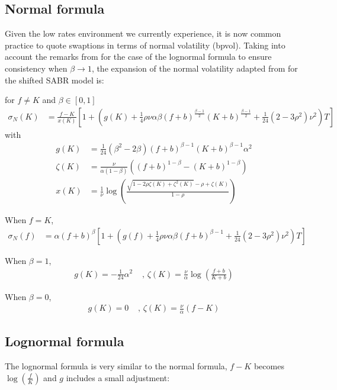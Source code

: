 \documentclass[]{rAMF2e}
\begin{document}
\subsection{Normal formula}
Given the low rates environment we currently experience, it is now common practice to quote swaptions in terms of normal volatility (bpvol). Taking into account the remarks from \citet{obloj2008fine} for the case of the lognormal formula to ensure consistency when $\beta \to 1$, the expansion of the normal volatility adapted from \citet{hagan2002managing} for the shifted SABR model is:

for $f \neq K$ and $\beta \in [0,1]$
\begin{align}
\sigma_N(K) &= \frac{f-K}{x(K)}\left[1+\left(g(K)+\frac{1}{4}\rho\nu\alpha\beta(f+b)^{\frac{\beta-1}{2}}(K+b)^{\frac{\beta-1}{2}}+\frac{1}{24}(2-3\rho^2)\nu^2\right)T\right]
\end{align}
with 
\begin{align*}
g(K) &= \frac{1}{24} (\beta^2-2\beta) (f+b)^{\beta-1} (K+b)^{\beta-1} \alpha^2\\
\zeta(K) &= \frac{\nu}{\alpha (1-\beta)} \left( (f+b)^{1-\beta} - (K+b)^{1-\beta} \right)\\
x(K) &= \frac{1}{\nu}\log\left(\frac{\sqrt{1-2\rho\zeta(K)+\zeta^2(K)}-\rho+\zeta(K)}{1-\rho} \right)
\end{align*}

When $f=K$, 
\begin{align}
\sigma_N(f) &= \alpha (f+b)^\beta \left[1+\left(g(f)+\frac{1}{4}\rho\nu\alpha\beta(f+b)^{\beta-1}+\frac{1}{24}(2-3\rho^2)\nu^2\right)T\right]
\end{align}

When $\beta = 1$,
\begin{align*}
g(K) = -\frac{1}{24}\alpha^2 &\texttt{ , } \zeta(K) = \frac{\nu}{\alpha} \log\left(\frac{f+b}{K+b}\right)
\end{align*}

When $\beta = 0$,
\begin{align*}
g(K) = 0 &\texttt{ , }\zeta(K) = \frac{\nu}{\alpha} \left(f-K\right)
\end{align*}
\subsection{Lognormal formula}
The lognormal formula is very similar to the normal formula, $f-K$ becomes $\log(\frac{f}{K})$ and $g$ includes a small adjustment:
\end{document}
